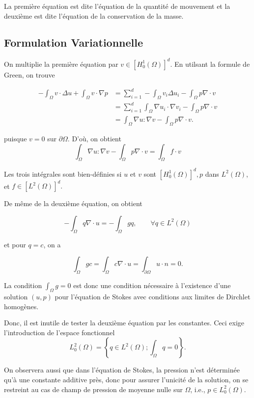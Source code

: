 La première équation est dite l'équation de la quantité de mouvement et la deuxième est dite l'équation de la conservation de la masse.
\subsection{Formulation Variationnelle}




On multiplie la première équation par $v\in \left[H_{0}^{1}(\Omega)\right]^{d}$. En utilsant la formule de Green, on trouve

\begin{eqnarray*}
-\int_{\Omega} v \cdot \Delta u+\int_{\Omega} v \cdot \nabla p&=\sum_{i=1}^{d}-\int_{\Omega} v_{i} \Delta u_{i}-\int_{\Omega} p \nabla \cdot v\\
&=\sum_{i=1}^{d} \int_{\Omega} \nabla u_{i} \cdot \nabla v_{i}-\int_{\Omega} p \nabla \cdot v\\
&=\int_{\Omega} \nabla u: \nabla v-\int_{\Omega} p \nabla \cdot v.
\end{eqnarray*}


puisque  $v=0$  sur $\partial\Omega$.  D'où, on obtient 
$$
\int_{\Omega} \nabla u: \nabla v-\int_{\Omega} p \nabla \cdot v=\int_{\Omega} f \cdot v
$$


Les trois  intégrales sont bien-définies si  $u$  et $v$ sont  $\left[H_{0}^{1}(\Omega)\right]^{d}, p$  dans  $L^{2}(\Omega)$,  et $f \in\left[L^{2}(\Omega)\right]^{d} .$

De même de la deuxième équation, on obtient

$$
-\int_{\Omega} q \nabla \cdot u 
=-\int_{\Omega} g q,  \qquad \forall q\in L^2(\Omega)
$$

et pour $q=c$, on a 

$$
\int_{\Omega} gc=\int_{\Omega} c\nabla \cdot u =\int_{\partial \Omega} u \cdot n=0.
$$

La condition $\displaystyle \int_{\Omega} g=0$ est donc une condition nécessaire à l'existence d'une solution $(u, p)$ pour l'équation  de Stokes avec  conditions aux limites de Dirchlet homogènes.

Donc,  il est inutile de tester la deuxième équation par les constantes. Ceci exige l'introduction de l'espace  fonctionnel
$$
L_{0}^{2}(\Omega)=\left\{q \in L^{2}(\Omega) ; \int_{\Omega} q=0\right\}.
$$

On observera aussi que dans l'équation  de Stokes, la pression n'est déterminée qu'à une constante additive près,  donc pour assurer l'unicité de la solution, on se restreint au cas de  champ de pression de moyenne nulle sur $\Omega $, i.e.,  $p\in L_{0}^{2}(\Omega)$. 


